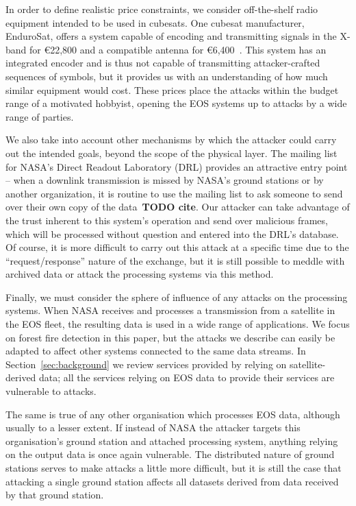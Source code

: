 In order to define realistic price constraints, we consider off-the-shelf radio equipment intended to be used in cubesats.
One cubesat manufacturer, EnduroSat, offers a system capable of encoding and transmitting signals in the X-band for €22,800 and a compatible antenna for €6,400~\cite{endurosat:xbandtransmitter,endurosat:xbandantenna}.
This system has an integrated encoder and is thus not capable of transmitting attacker-crafted sequences of symbols, but it provides us with an understanding of how much similar equipment would cost.
These prices place the attacks within the budget range of a motivated hobbyist, opening the EOS systems up to attacks by a wide range of parties.

We also take into account other mechanisms by which the attacker could carry out the intended goals, beyond the scope of the physical layer.
The mailing list for NASA's Direct Readout Laboratory (DRL) provides an attractive entry point -- when a downlink transmission is missed by NASA's ground stations or by another organization, it is routine to use the mailing list to ask someone to send over their own copy of the data~\textbf{TODO cite}.
Our attacker can take advantage of the trust inherent to this system's operation and send over malicious frames, which will be processed without question and entered into the DRL's database.
Of course, it is more difficult to carry out this attack at a specific time due to the ``request/response'' nature of the exchange, but it is still possible to meddle with archived data or attack the processing systems via this method.

Finally, we must consider the sphere of influence of any attacks on the processing systems.
When NASA receives and processes a transmission from a satellite in the EOS fleet, the resulting data is used in a wide range of applications.
We focus on forest fire detection in this paper, but the attacks we describe can easily be adapted to affect other systems connected to the same data streams.
In Section~\ref{sec:background} we review services provided by relying on satellite-derived data; all the services relying on EOS data to provide their services are vulnerable to attacks.

The same is true of any other organisation which processes EOS data, although usually to a lesser extent.
If instead of NASA the attacker targets this organisation's ground station and attached processing system, anything relying on the output data is once again vulnerable.
The distributed nature of ground stations serves to make attacks a little more difficult, but it is still the case that attacking a single ground station affects all datasets derived from data received by that ground station.
